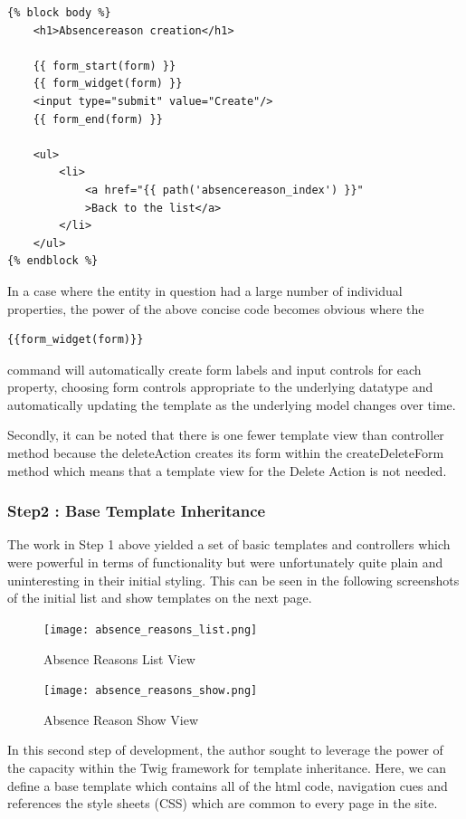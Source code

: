 \documentclass[a4paper,Times New Roman 11pt]{article}
\begin{document}
\begin{verbatim}
{% block body %}
    <h1>Absencereason creation</h1>

    {{ form_start(form) }}
    {{ form_widget(form) }}
    <input type="submit" value="Create"/>
    {{ form_end(form) }}

    <ul>
        <li>
            <a href="{{ path('absencereason_index') }}"
            >Back to the list</a>
        </li>
    </ul>
{% endblock %}
\end{verbatim}
In a case where the entity in question had a large number of individual properties, the power of the above concise code becomes obvious where the \begin{verbatim}{{form_widget(form)}} \end{verbatim} command will automatically create form labels and input controls for each property, choosing form controls appropriate to the underlying datatype and automatically updating the template as the underlying model changes over time.

Secondly, it can be noted that there is one fewer template view than controller method  because the deleteAction creates its form within the createDeleteForm method which means that a template view for the Delete Action is not needed.

\subsubsection {Step2 : Base Template Inheritance}

The work in Step 1 above yielded a set of basic templates and controllers which were powerful in terms of functionality but were unfortunately quite plain and uninteresting in their initial styling.  This can be seen in the following screenshots of the initial list and show templates on the next page.
 \begin{figure}[h!]
\texttt{[image: absence\_reasons\_list.png]}
  \caption{Absence Reasons List View}
  \label{fig:Absence Reasons List View}
\end{figure}

 \begin{figure}[h!]
\texttt{[image: absence\_reasons\_show.png]}
  \caption{Absence Reason Show View}
  \label{fig:Absence Reason Show View}
\end{figure}


In this second step of development, the author sought to leverage the power of the capacity within the Twig framework for template inheritance. Here, we can define a base template which contains all of the html code, navigation cues and references the style sheets (CSS) which are common to every page in the site.
\end{document}
